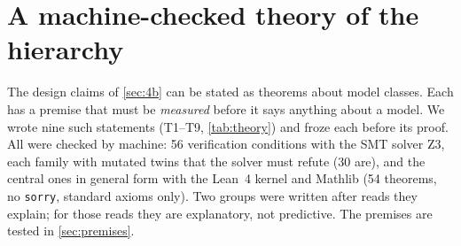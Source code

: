 \documentclass[10pt,twocolumn]{article}
\theoremstyle{remark}
\begin{document}
\section{A machine-checked theory of the hierarchy}\label{sec:theory}
The design claims of \cref{sec:4b} can be stated as theorems about model classes. Each has a premise that must be \emph{measured}
before it says anything about a model. We wrote nine such statements (T1--T9, \cref{tab:theory}) and froze each before its proof.
All were checked by machine: 56 verification conditions with the SMT solver Z3, each family with mutated twins that the solver must
refute (30 are), and the central ones in general form with the Lean~4 kernel and Mathlib (54 theorems, no \texttt{sorry}, standard
axioms only). Two groups were written after reads they explain; for those reads they are explanatory, not predictive. The premises
are tested in \cref{sec:premises}.
\end{document}
